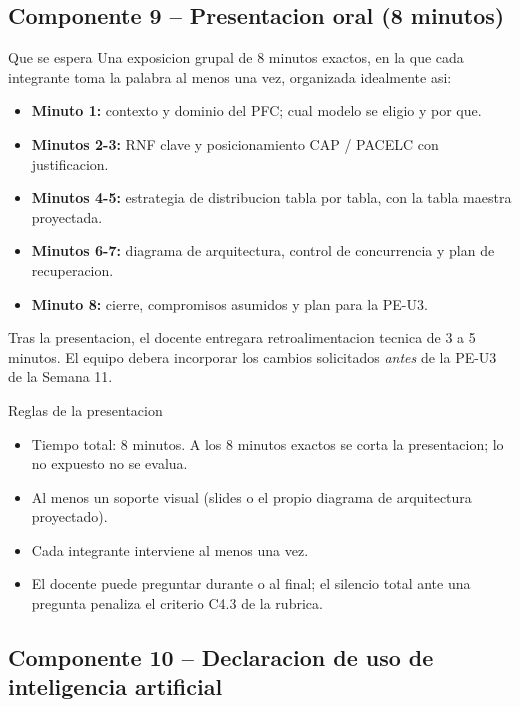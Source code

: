 \documentclass[11pt,a4paper]{article}
\begin{document}
\subsection{Componente 9 -- Presentacion oral (8 minutos)}

\begin{cajadefinicion}{Que se espera}
Una exposicion grupal de 8 minutos exactos, en la que cada integrante toma la palabra al menos una vez, organizada idealmente asi:
\begin{itemize}
\item \textbf{Minuto 1:} contexto y dominio del PFC; cual modelo se eligio y por que.
\item \textbf{Minutos 2-3:} RNF clave y posicionamiento CAP / PACELC con justificacion.
\item \textbf{Minutos 4-5:} estrategia de distribucion tabla por tabla, con la tabla maestra proyectada.
\item \textbf{Minutos 6-7:} diagrama de arquitectura, control de concurrencia y plan de recuperacion.
\item \textbf{Minuto 8:} cierre, compromisos asumidos y plan para la PE-U3.
\end{itemize}
Tras la presentacion, el docente entregara retroalimentacion tecnica de 3 a 5 minutos. El equipo debera incorporar los cambios solicitados \emph{antes} de la PE-U3 de la Semana 11.
\end{cajadefinicion}

\begin{cajaalerta}{Reglas de la presentacion}
\begin{itemize}
\item Tiempo total: 8 minutos. A los 8 minutos exactos se corta la presentacion; lo no expuesto no se evalua.
\item Al menos un soporte visual (slides o el propio diagrama de arquitectura proyectado).
\item Cada integrante interviene al menos una vez.
\item El docente puede preguntar durante o al final; el silencio total ante una pregunta penaliza el criterio C4.3 de la rubrica.
\end{itemize}
\end{cajaalerta}

\subsection{Componente 10 -- Declaracion de uso de inteligencia artificial}
\end{document}
